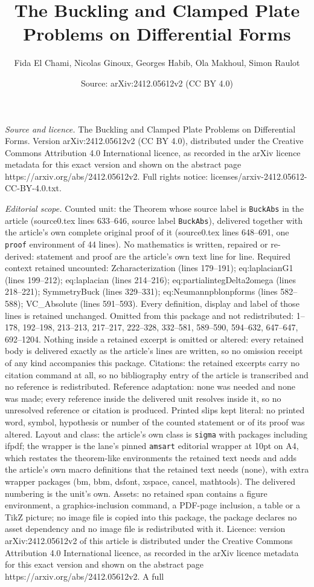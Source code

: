 \documentclass[10pt,a4paper]{amsart}
\title[The Buckling and Clamped Plate Problems on Differential Form]{The Buckling and Clamped Plate Problems on Differential Forms}
\author{Fida El Chami, Nicolas Ginoux, Georges Habib, Ola Makhoul, Simon Raulot}
\date{Source: arXiv:2412.05612v2 (CC BY 4.0)}
\begin{document}
\maketitle

\noindent\emph{Source and licence.} The Buckling and Clamped Plate Problems on Differential Forms. Version arXiv:2412.05612v2 (CC BY 4.0), distributed under the Creative Commons Attribution 4.0 International licence, as recorded in the arXiv licence metadata for this exact version and shown on the abstract page https://arxiv.org/abs/2412.05612v2. Full rights notice: licenses/arxiv-2412.05612-CC-BY-4.0.txt.\par\smallskip

\noindent\textit{Editorial scope.} Counted unit: the Theorem whose source label is \texttt{BuckAbs} in the article (source0.tex lines 633--646, source label \texttt{BuckAbs}), delivered together with the article's own complete original proof of it (source0.tex lines 648--691, one \texttt{proof} environment of 44 lines). No mathematics is written, repaired or re-derived: statement and proof are the article's own text line for line. Required context retained uncounted: Zcharacterization (lines 179--191); eq:laplacianG1 (lines 199--212); eq:laplacian (lines 214--216); eq:partialintegDelta2omega (lines 218--221); SymmetryBuck (lines 329--331); eq:Neumannpblonpforms (lines 582--588); VC\_Absolute (lines 591--593). Every definition, display and label of those lines is retained unchanged. Omitted from this package and not redistributed: 1--178, 192--198, 213--213, 217--217, 222--328, 332--581, 589--590, 594--632, 647--647, 692--1204. Nothing inside a retained excerpt is omitted or altered: every retained body is delivered exactly as the article's lines are written, so no omission receipt of any kind accompanies this package. Citations: the retained excerpts carry no citation command at all, so no bibliography entry of the article is transcribed and no reference is redistributed. Reference adaptation: none was needed and none was made; every reference inside the delivered unit resolves inside it, so no unresolved reference or citation is produced. Printed slips kept literal: no printed word, symbol, hypothesis or number of the counted statement or of its proof was altered. Layout and class: the article's own class is \texttt{sigma} with packages including ifpdf; the wrapper is the lane's pinned \texttt{amsart} editorial wrapper at 10pt on A4, which restates the theorem-like environments the retained text needs and adds the article's own macro definitions that the retained text needs (none), with extra wrapper packages (bm, bbm, dsfont, xspace, cancel, mathtools). The delivered numbering is the unit's own. Assets: no retained span contains a figure environment, a graphics-inclusion command, a PDF-page inclusion, a table or a TikZ picture; no image file is copied into this package, the package declares no asset dependency and no image file is redistributed with it. Licence: version arXiv:2412.05612v2 of this article is distributed under the Creative Commons Attribution 4.0 International licence, as recorded in the arXiv licence metadata for this exact version and shown on the abstract page https://arxiv.org/abs/2412.05612v2. A full 
\end{document}
